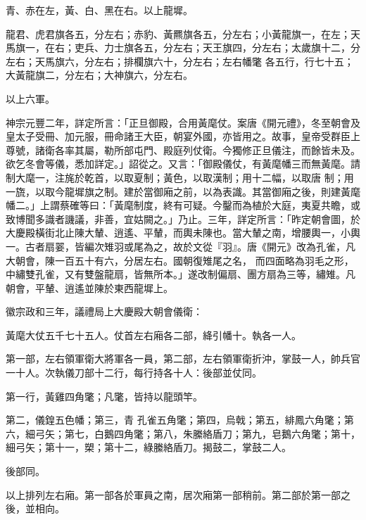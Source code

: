 \begin{pinyinscope}
 青、赤在左，黃、白、黑在右。以上龍墀。



 龍君、虎君旗各五，分左右；赤豹、黃羆旗各五，分左右；小黃龍旗一，在左；天馬旗一，在右；吏兵、力士旗各五，分左右；天王旗四，分左右；太歲旗十二，分左右；天馬旗六，分左右；排欄旗六十，分左右；左右幡氅
 各五行，行七十五；大黃龍旗二，分左右；大神旗六，分左右。



 以上六軍。



 神宗元豐二年，詳定所言：「正旦御殿，合用黃麾仗。案唐《開元禮》，冬至朝會及皇太子受冊、加元服，冊命諸王大臣，朝宴外國，亦皆用之。故事，皇帝受群臣上尊號，諸衛各率其屬，勒所部屯門、殿庭列仗衛。今獨修正旦儀注，而餘皆未及。欲乞冬會等儀，悉加詳定。」詔從之。又言：「御殿儀仗，有黃麾幡三而無黃麾。請制大麾一，注旄於乾首，以取夏制；黃色，以取漢制；用十二幅，以取唐
 制；用一旒，以取今龍墀旗之制。建於當御廂之前，以為表識。其當御廂之後，則建黃麾幡二。」上謂蔡確等曰：「黃麾制度，終有可疑。今鑿而為植於大庭，夷夏共瞻，或致博聞多識者譏議，非善，宜姑闕之。」乃止。三年，詳定所言：「昨定朝會圖，於大慶殿橫街北止陳大輦、逍遙、平輦，而輿未陳也。當大輦之南，增腰輿一，小輿一。古者扇翣，皆編次雉羽或尾為之，故於文從『羽』。唐《開元》改為孔雀，凡大朝會，陳一百五十有六，分居左右。國朝復雉尾之名，
 而四面略為羽毛之形，中繡雙孔雀，又有雙盤龍扇，皆無所本。」遂改制偏扇、團方扇為三等，繡雉。凡朝會，平輦、逍遙並陳於東西龍墀上。



 徽宗政和三年，議禮局上大慶殿大朝會儀衛：



 黃麾大仗五千七十五人。仗首左右廂各二部，絳引幡十。執各一人。



 第一部，左右領軍衛大將軍各一員，第二部，左右領軍衛折沖，掌鼓一人，帥兵官一十人。次執儀刀部十二行，每行持各十人：後部並仗同。



 第一行，黃雞四角氅；凡氅，皆持以龍頭竿。



 第二，儀鍠五色幡；第三，青
 孔雀五角氅；第四，烏戟；第五，緋鳳六角氅；第六，細弓矢；第七，白鵝四角氅；第八，朱縢絡盾刀；第九，皂鵝六角氅；第十，細弓矢；第十一，槊；第十二，綠縢絡盾刀。揭鼓二，掌鼓二人。



 後部同。



 以上排列左右廂。第一部各於軍員之南，居次廂第一部稍前。第二部於第一部之後，並相向。




\end{pinyinscope}
